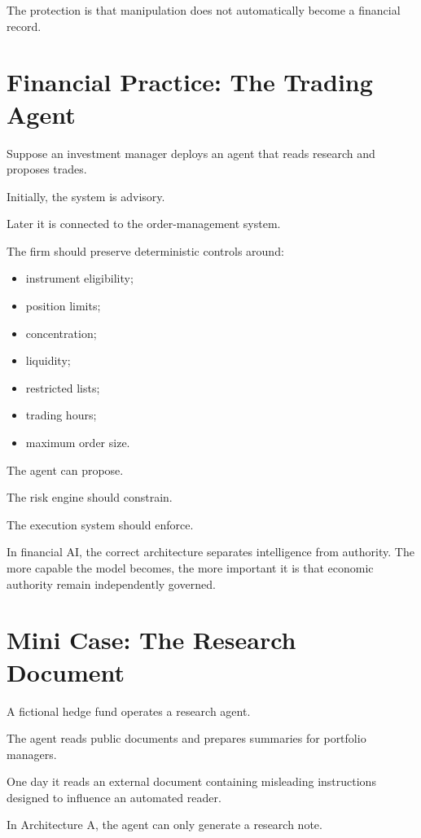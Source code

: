 The protection is that manipulation does not automatically become a financial record.

\section{Financial Practice: The Trading Agent}

Suppose an investment manager deploys an agent that reads research and proposes trades.

Initially, the system is advisory.

Later it is connected to the order-management system.

The firm should preserve deterministic controls around:

\begin{itemize}
    \item instrument eligibility;
    \item position limits;
    \item concentration;
    \item liquidity;
    \item restricted lists;
    \item trading hours;
    \item maximum order size.
\end{itemize}

The agent can propose.

The risk engine should constrain.

The execution system should enforce.

\begin{risklens}
In financial AI, the correct architecture separates intelligence from authority. The more capable the model becomes, the more important it is that economic authority remain independently governed.
\end{risklens}

\section{Mini Case: The Research Document}

A fictional hedge fund operates a research agent.

The agent reads public documents and prepares summaries for portfolio managers.

One day it reads an external document containing misleading instructions designed to influence an automated reader.

In Architecture A, the agent can only generate a research note.

